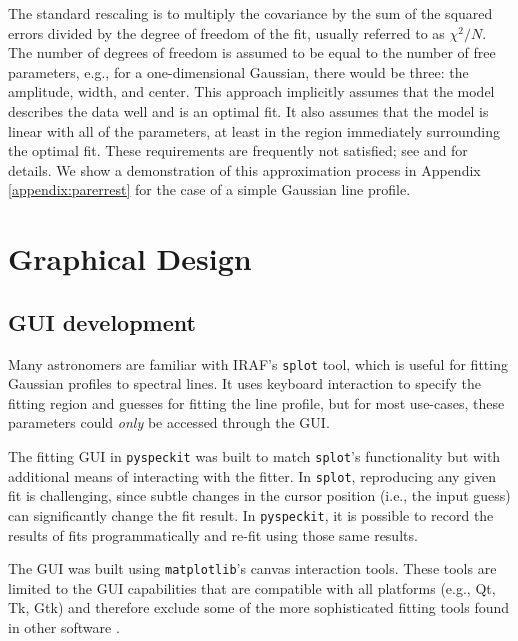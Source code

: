\documentclass[twocolumn]{aastex62}
\newcommand{\pyspeckit}{\texttt{pyspeckit}\xspace}
\begin{document}
The standard rescaling is to multiply the covariance by the sum of the squared
errors divided by the degree of freedom of the fit, usually referred to
as $\chi^2/N$.  The number of degrees of freedom is assumed to be equal to the
number of free parameters, e.g., for a one-dimensional Gaussian, there would be
three: the amplitude, width, and center.  This approach implicitly assumes that
the
model describes the data well and is an optimal fit.  It also assumes that
the model is linear with all of the parameters, at least in the region immediately
surrounding the optimal fit.  These requirements are frequently not satisfied;
see \citet{Andrae2010a} and \citet{Andrae2010b} for details.
We show a demonstration of this approximation process in Appendix \ref{appendix:parerrest}
for the case of a simple Gaussian line profile.




\section{Graphical Design}
\label{sec:gui}
\subsection{GUI development}
Many astronomers are familiar with IRAF's \texttt{splot} tool, which is useful
for fitting Gaussian profiles to spectral lines.  It uses keyboard interaction
to specify the fitting region and guesses for fitting the line profile, but for
most use-cases, these parameters could \emph{only} be accessed through the GUI.

The fitting GUI in \texttt{pyspeckit} was built to match \texttt{splot}'s
functionality but with additional means of interacting with the fitter.  In
\texttt{splot}, reproducing any given fit is challenging, since subtle changes
in the cursor position (i.e., the input guess) can significantly change the fit
result.  In \pyspeckit, it is possible to record the results of fits
programmatically and re-fit using those same results.

The GUI was built using \texttt{matplotlib}'s canvas interaction tools.  These
tools are limited to the GUI capabilities that are compatible with all platforms
(e.g., Qt, Tk, Gtk) and therefore exclude some of the more sophisticated fitting
tools found in other software \citep[e.g., \texttt{glue}][]{Beaumont2014b}.
\end{document}
